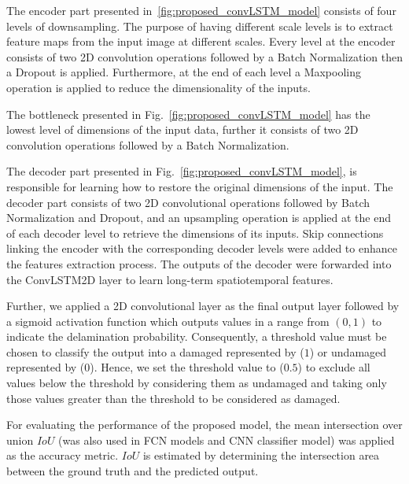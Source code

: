 The encoder part presented in~\ref{fig:proposed_convLSTM_model} consists of four levels of downsampling. 
The purpose of having different scale levels is to extract feature maps from the input image at different scales.
Every level at the encoder consists of two 2D convolution operations followed by a Batch Normalization then a Dropout is applied. 
Furthermore, at the end of each level a Maxpooling operation is applied to reduce the dimensionality of the inputs. 

The bottleneck presented in Fig.~\ref{fig:proposed_convLSTM_model} has the lowest level of dimensions of the input data, further it consists of two 2D convolution operations followed by a Batch Normalization.

The decoder part presented in Fig.~\ref{fig:proposed_convLSTM_model}, is responsible for learning how to restore the original dimensions of the input.
The decoder part consists of two 2D convolutional operations followed by Batch Normalization and Dropout, and an upsampling operation is applied at the end of each decoder level to retrieve the dimensions of its inputs.
Skip connections linking the encoder with the corresponding decoder levels were added to enhance the features extraction process.
The outputs of the decoder were forwarded into the ConvLSTM2D layer to learn long-term spatiotemporal features.

Further, we applied a 2D convolutional layer as the final output layer followed by a sigmoid activation function which outputs values in a range from \((0,1)\) to indicate the delamination probability.
Consequently, a threshold value must be chosen to classify the output into a damaged represented by (\(1\)) or undamaged represented by (\(0\)).
Hence, we set the threshold value to (\(0.5\)) to exclude all values below the threshold by considering them as undamaged and taking only those values greater than the threshold to be considered as damaged.

For evaluating the performance of the proposed model, the mean 
intersection over union \(IoU\) (was also used in FCN models and CNN classifier model) was applied as the accuracy metric. 
\(IoU\) is estimated by determining the intersection
area between the ground truth and the predicted output. 
\newpage
